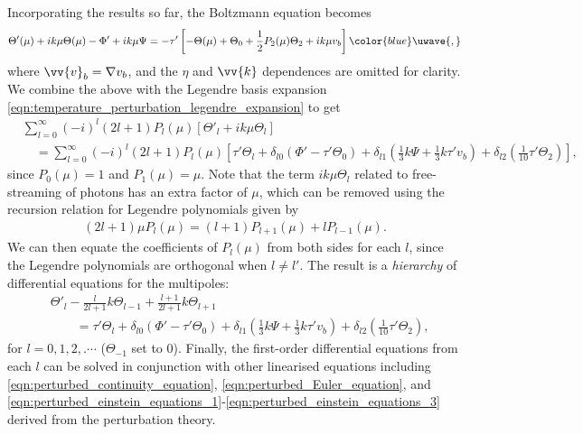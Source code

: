 \documentclass[a4paper,12pt,times,custombib,print,index]{Classes/PhDThesisPSnPDF} %
\providecommand{\DIFadd}[1]{{\protect\color{blue}\uwave{#1}}} %
\providecommand{\DIFaddbegin}{} %
\providecommand{\DIFaddend}{} %
\newcommand{\DIFaddincludegraphics}[2][]{{\color{blue}\fbox{\DIFOincludegraphics[#1]{#2}}}} %
\DeclareRobustCommand{\DIFaddbegin}{\DIFOaddbegin \let\includegraphics\DIFaddincludegraphics} %
\DeclareRobustCommand{\DIFaddend}{\DIFOaddend \let\includegraphics\DIFOincludegraphics} %
\begin{document}
Incorporating the results so far, the Boltzmann equation becomes 
\begin{align}
	\Theta'(\mu) + ik\mu \Theta(\mu) - \Phi' + ik\mu\Psi = -\tau' \left[ - \Theta(\mu) + \Theta_0 + \frac{1}{2}P_2(\mu)\Theta_2 + ik\mu v_b \right]\DIFaddbegin \DIFadd{, }\DIFaddend \label{eqn:boltzmann_equation_in_fourier_space}
\end{align}
where $\vv{v}_b = \nabla v_b$, and the $\eta$ and $\vv{k}$ dependences are omitted for clarity. We combine the above with the Legendre basis expansion \eqref{eqn:temperature_perturbation_legendre_expansion} to get
\begin{align}
	&\sum_{l=0}^{\infty} (-i)^l (2l+1) P_l (\mu) \left[ \Theta'_l + ik\mu \Theta_l \right] \nonumber\\
	&\quad= \sum_{l=0}^{\infty} (-i)^l (2l+1) P_l (\mu) \left[ \tau' \Theta_l + \delta_{l0} (\Phi' - \tau'\Theta_0) + \delta_{l1} (\frac{1}{3}k\Psi + \frac{1}{3}k\tau' v_b) + \delta_{l2}(\frac{1}{10}\tau' \Theta_2) \right],
\end{align}
since $P_0(\mu) = 1$ and $P_1(\mu)=\mu$. Note that the term $ik\mu \Theta_l$ related to free-streaming of photons has an extra factor of $\mu$, which can be removed using the recursion relation for Legendre polynomials given by
\begin{align}
	(2l+1)\mu P_l(\mu) = (l+1) P_{l+1} (\mu) + l P_{l-1} (\mu).
\end{align}
We can then equate the coefficients of $P_l(\mu)$ from both sides for each $l$, since the Legendre polynomials are orthogonal when $l\neq l'$. The result is a \textit{hierarchy} of differential equations for the multipoles:
\begin{align}
	&\Theta'_l - \frac{l}{2l+1} k\Theta_{l-1} + \frac{l+1}{2l+1} k\Theta_{l+1}  \nonumber\\
	&\qquad= \tau' \Theta_l + \delta_{l0} (\Phi' - \tau' \Theta_0) + \delta_{l1} (\frac{1}{3} k\Psi + \frac{1}{3} k\tau' v_b) + \delta_{l2}(\frac{1}{10}\tau' \Theta_2),
\end{align}
for $l=0,1,2,.\cdots$ ($\Theta_{-1}$ set to $0$). Finally, the first-order differential equations from each $l$ can be solved in conjunction with other linearised equations including \eqref{eqn:perturbed_continuity_equation}, \eqref{eqn:perturbed_Euler_equation}, and \eqref{eqn:perturbed_einstein_equations_1}-\eqref{eqn:perturbed_einstein_equations_3} derived from the perturbation theory.
\end{document}
